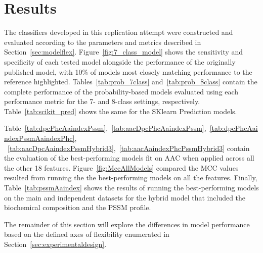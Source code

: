 \section {Results}
\label{sec:results}

The classifiers developed in this replication attempt were constructed and evaluated according to the parameters
and metrics described in Section~\ref{sec:modelflex}. Figure~\ref{fig:7_class_model} shows the sensitivity
and specificity of each tested model alongside the performance of the originally published model, with 10\% of models
most closely matching performance to the reference highlighted.
Tables~\ref{tab:prob_7class} and~\ref{tab:prob_8class} contain the complete performance of the probability-based models
evaluated using each performance metric for the 7- and 8-class settings, respectively. Table~\ref{tab:scikit_pred}
shows the same for the SKlearn Prediction models.

Table~\ref{tab:dpcPhcAaindexPssm},~\ref{tab:aacDpcPhcAaindexPssm},~\ref{tab:dpcPhcAaindexPssmAaindexPhc},
~\ref{tab:aacDpcAaindexPssmHybrid3},~\ref{tab:aacAaindexPhcPssmHybrid3}
contain the evaluation of the best-performing models fit on AAC when 
applied across all the other 18 features. Figure~\ref{fig:MccAllModels} compared the MCC values resulted 
from running the the best-performing models on all the features. Finally, Table~\ref{tab:pssmAaindex} 
shows the results of running the best-performing models on the main and independent datasets for the 
hybrid model that included the biochemical composition and the PSSM profile.


The remainder of this section will explore the differences in model performance based on the defined axes of
flexibility enumerated in Section~\ref{sec:experimentaldesign}.

